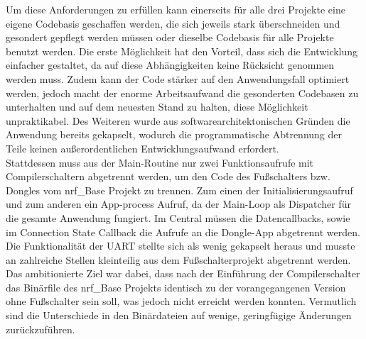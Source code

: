 Um diese Anforderungen zu erfüllen kann einerseits für alle drei Projekte eine eigene Codebasis geschaffen werden, die sich jeweils stark überschneiden und gesondert gepflegt werden müssen oder dieselbe Codebasis für alle Projekte benutzt werden. Die erste Möglichkeit hat den Vorteil, dass sich die Entwicklung einfacher gestaltet, da auf diese Abhängigkeiten keine Rücksicht genommen werden muss. Zudem kann der Code stärker auf den Anwendungsfall optimiert werden, jedoch macht der enorme Arbeitsaufwand die gesonderten Codebasen zu unterhalten und auf dem neuesten Stand zu halten, diese Möglichkeit unpraktikabel. Des Weiteren wurde aus softwarearchitektonischen Gründen die Anwendung bereits gekapselt, wodurch die programmatische Abtrennung der Teile keinen außerordentlichen Entwicklungsaufwand erfordert.\\
Stattdessen muss aus der Main-Routine nur zwei Funktionsaufrufe mit Compilerschaltern abgetrennt werden, um den Code des Fußschalters bzw. Dongles vom nrf\_Base Projekt zu trennen. Zum einen der Initialisierungsaufruf und zum anderen ein App-process Aufruf, da der Main-Loop als Dispatcher für die gesamte Anwendung fungiert. Im Central müssen die Datencallbacks, sowie im Connection State Callback die Aufrufe an die Dongle-App abgetrennt werden. Die Funktionalität der \ac{UART} stellte sich als wenig gekapselt heraus und musste an zahlreiche Stellen kleinteilig aus dem Fußschalterprojekt abgetrennt werden.\\ 
Das ambitionierte Ziel war dabei, dass nach der Einführung der Compilerschalter das Binärfile des nrf\_Base Projekts identisch zu der vorangegangenen Version ohne Fußschalter sein soll, was jedoch nicht erreicht werden konnten. Vermutlich sind die Unterschiede in den Binärdateien auf wenige, geringfügige Änderungen zurückzuführen.


